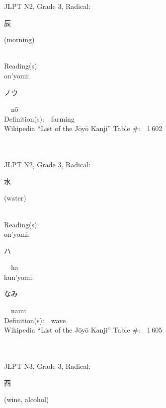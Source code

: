 \begin{multicols}{2}
{JLPT N2, Grade 3, Radical:\ \ {\begin{CJK}{UTF8}{min} 辰 \end{CJK}} (morning) } \\
Reading(s):\ \ \\
{\hspace*{1em}}on'yomi:\ \ \\
{\hspace*{2em}}{\begin{CJK}{UTF8}{min} ノウ \end{CJK}}\ \ n\=o\ \ \\
Definition(s):\ \ farming \\
Wikipedia ``List of the J\=oy\=o Kanji'' Table \#:\ \ 1\,602 \\
\ \ \\
{\fontsize{34pt}{40pt}  }\ \ \\  %
{JLPT N2, Grade 3, Radical:\ \ {\begin{CJK}{UTF8}{min} 水 \end{CJK}} (water) } \\
Reading(s):\ \ \\
{\hspace*{1em}}on'yomi:\ \ \\
{\hspace*{2em}}{\begin{CJK}{UTF8}{min} ハ \end{CJK}}\ \ ha\ \ \\
{\hspace*{1em}}kun'yomi:\ \ \\
{\hspace*{2em}}{\begin{CJK}{UTF8}{min} なみ \end{CJK}}\ \ nami\ \ \\
Definition(s):\ \ wave \\
Wikipedia ``List of the J\=oy\=o Kanji'' Table \#:\ \ 1\,605 \\
\ \ \\
{\fontsize{34pt}{40pt}  }\ \ \\  %
{JLPT N3, Grade 3, Radical:\ \ {\begin{CJK}{UTF8}{min} 酉 \end{CJK}} (wine, alcohol) } \\

\end{multicols}
